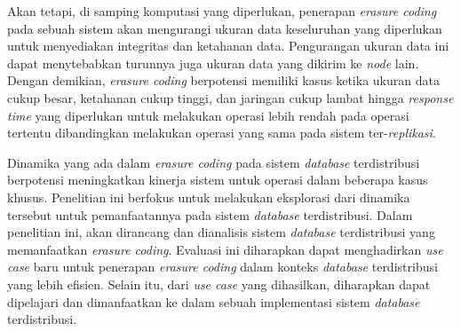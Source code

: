 Akan tetapi, di samping komputasi yang diperlukan, penerapan \textit{erasure coding} pada sebuah sistem akan mengurangi ukuran data keseluruhan yang diperlukan untuk menyediakan integritas dan ketahanan data. Pengurangan ukuran data ini dapat menytebabkan turunnya juga ukuran data yang dikirim ke \textit{node} lain. Dengan demikian, \textit{erasure coding} berpotensi memiliki kasus ketika ukuran data cukup besar, ketahanan cukup tinggi, dan jaringan cukup lambat hingga \textit{response time} yang diperlukan untuk melakukan operasi lebih rendah pada operasi tertentu dibandingkan melakukan operasi yang sama pada sistem ter-\textit{replikasi}.


Dinamika yang ada dalam \textit{erasure coding} pada sistem \textit{database} terdistribusi berpotensi meningkatkan kinerja sistem untuk operasi dalam beberapa kasus khusus. Penelitian ini berfokus untuk melakukan eksplorasi dari dinamika tersebut untuk pemanfaatannya pada sistem \textit{database} terdistribusi. Dalam penelitian ini, akan dirancang dan dianalisis sistem \textit{database} terdistribusi yang memanfaatkan \textit{erasure coding}. Evaluasi ini diharapkan dapat menghadirkan \textit{use case} baru untuk penerapan \textit{erasure coding} dalam konteks \textit{database} terdistribusi yang lebih efisien. Selain itu, dari \textit{use case} yang dihasilkan, diharapkan dapat dipelajari dan dimanfaatkan ke dalam sebuah implementasi sistem \textit{database} terdistribusi.


